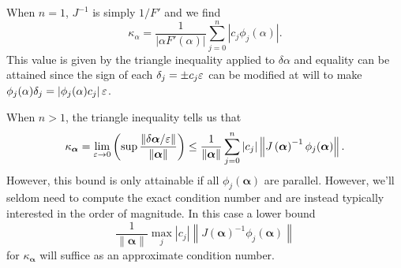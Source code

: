 When \(n = 1\), \(J^{-1}\) is simply \(1 / F'\) and we find
\begin{equation}
\kappa_{\alpha} =
  \frac{1}{\left|\alpha F'(\alpha)\right|} \sum_{j = 0}^n \left|
  c_j \phi_j(\alpha)\right|.
\end{equation}
This value is given by the triangle inequality applied to
\(\delta \alpha\)  and equality can be attained since the sign
of each \(\delta_j = \pm c_j \varepsilon\) can be modified at will to make
\(\phi_j(\alpha) \delta_j = \left|\phi_j(\alpha) c_j\right| \varepsilon\).

When \(n > 1\), the triangle inequality tells us that
\begin{equation}
\kappa_{\bm{\alpha}} =
  \lim_{\varepsilon \to 0} \left(\sup \frac{\left \lVert\delta \bm{\alpha} /
  \varepsilon\right \rVert}{\left \lVert\bm{\alpha}\right \rVert}\right) \leq
  \frac{1}{\left \lVert\bm{\alpha}\right \rVert} \sum_{j = 0}^n
  \left|c_j\right| \left \lVert J\left(\bm{\alpha}\right)^{-1}
  \phi_j(\bm{\alpha})\right \rVert.
\end{equation}
However, this bound is only attainable if all
\(\phi_j(\bm{\alpha})\) are parallel. However, we'll seldom need to
compute the exact condition number and are instead typically
interested in the order of magnitude. In this case a lower
bound
\begin{equation}
\frac{1}{\left \lVert\bm{\alpha}\right \rVert}
\max_j \left|c_j\right| \left \lVert J\left(\bm{\alpha}\right)^{-1}
\phi_j(\bm{\alpha})\right \rVert
\end{equation}
for \(\kappa_{\bm{\alpha}}\)
will suffice as an approximate condition number.

